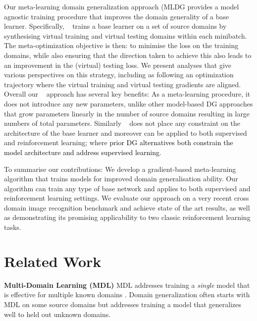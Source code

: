 \documentclass[letterpaper]{article} \usepackage{aaai18}  \usepackage{times}  \usepackage{helvet}  \usepackage{courier}  \usepackage{url}  \usepackage{graphicx}  \usepackage{amsmath}
\newcommand{\name}[1]{MLDG}
\newcommand{\keypoint}[1]{\vspace{0.1cm}\noindent\textbf{#1}\quad}
\begin{document}
Our meta-learning domain generalization approach (\name) provides a model agnostic training procedure that improves the domain generality of a base learner. Specifically, \name~ trains a base learner on a set of source domains by synthesising virtual training and virtual testing domains within each minibatch. The meta-optimization objective is then: to minimise the loss on the training domains, while also ensuring that the direction taken to 
achieve this also leads to an improvement in the (virtual) testing loss. 
We present analyses that give various perspectives on this strategy, including as following an optimization trajectory where the virtual training and virtual testing gradients are aligned. Overall our \name~ approach has several key benefits: As a meta-learning procedure, it does not introduce any new parameters, unlike other model-based DG approaches that grow parameters linearly in the number of source domains \cite{khosla2012undoing,ghifary2015domain,da2017dg,bousmalis2016domain} resulting in large numbers of total parameters. Similarly \name~ does not place any constraint on the architecture of the base learner and moreover can be applied to both supervised and reinforcement learning; where \textcolor{black}{prior DG alternatives \cite{khosla2012undoing,ghifary2015domain,da2017dg} both constrain the model architecture and address supervised learning}.

To summarise our contributions: We develop a gradient-based meta-learning algorithm that trains models for improved domain generalisation ability. Our algorithm can train any type of base network and applies to both supervised and reinforcement learning settings. We evaluate our approach on a very recent cross domain image recognition benchmark and achieve state of the art results, as well as demonstrating its promising applicability to two classic reinforcement learning tasks. 







\section{Related Work}
\vspace{-0.1cm}
\keypoint{Multi-Domain Learning (MDL)} MDL addresses training a \emph{single} model that is effective for multiple known domains \cite{daume2007easyDA,rebuff2017mdl,bilen2017universal}. Domain generalization often starts with MDL on some source domains  but addresses training a model that generalizes well to held out unknown domains.
\end{document}
